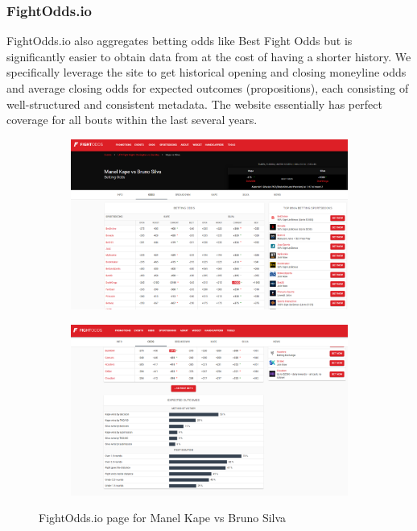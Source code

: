 \documentclass[12pt,twoside]{report}
\begin{document}
\subsubsection{FightOdds.io}

FightOdds.io also aggregates betting odds like Best Fight Odds but is significantly easier to obtain data from at the cost of having a shorter history. We specifically leverage the site to get historical opening and closing moneyline odds and average closing odds for expected outcomes (propositions), each consisting of well-structured and consistent metadata. The website essentially has perfect coverage for all bouts within the last several years.

\begin{figure}[htb]
\centering
\captionsetup{justification=centering}
\begin{subfigure}{.5\linewidth}
  \centering
  \includegraphics[width=0.8\linewidth]{figures/fightoddsio1.png}
\end{subfigure}%
\begin{subfigure}{.5\linewidth}
  \centering
  \includegraphics[width=0.8\linewidth]{figures/fightoddsio2.png}
\end{subfigure}
\caption{FightOdds.io page for Manel Kape vs Bruno Silva}
\end{figure}
\end{document}
